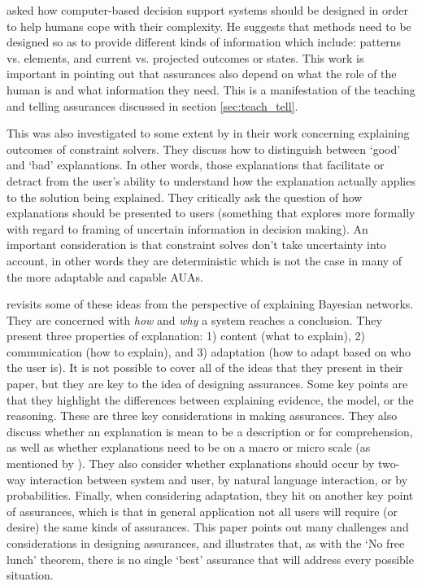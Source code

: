     \citet{Rouse1986-dz} asked how computer-based decision support systems should be designed in order to help humans cope with their complexity. He suggests that methods need to be designed so as to provide different kinds of information which include: patterns vs. elements, and current vs. projected outcomes or states. This work is important in pointing out that assurances also depend on what the role of the human is and what information they need. This is a manifestation of the teaching and telling assurances discussed in section \ref{sec:teach_tell}.

    This was also investigated to some extent by \citet{Wallace2001-fm} in their work concerning explaining outcomes of constraint solvers. They discuss how to distinguish between `good' and `bad' explanations. In other words, those explanations that facilitate or detract from the user's ability to understand how the explanation actually applies to the solution being explained. They critically ask the question of how explanations should be presented to users (something that \citet{Kuhn1997-qc} explores more formally with regard to framing of uncertain information in decision making). An important consideration is that constraint solves don't take uncertainty into account, in other words they are deterministic which is not the case in many of the more adaptable and capable AUAs.

    \citet{Lacave2002-cu} revisits some of these ideas from the perspective of explaining Bayesian networks. They are concerned with \emph{how} and \emph{why} a system reaches a conclusion. They present three properties of explanation: 1) content (what to explain), 2) communication (how to explain), and 3) adaptation (how to adapt based on who the user is). It is not possible to cover all of the ideas that they present in their paper, but they are key to the idea of designing assurances. Some key points are that they highlight the differences between explaining evidence, the model, or the reasoning. These are three key considerations in making assurances. They also discuss whether an explanation is mean to be a description or for comprehension, as well as whether explanations need to be on a macro or micro scale (as mentioned by \citeauthor{Ruping2006-xj}). They also consider whether explanations should occur by two-way interaction between system and user, by natural language interaction, or by probabilities. Finally, when considering adaptation, they hit on another key point of assurances, which is that in general application not all users will require (or desire) the same kinds of assurances. This paper points out many challenges and considerations in designing assurances, and illustrates that, as with the `No free lunch' theorem, there is no single `best' assurance that will address every possible situation.


